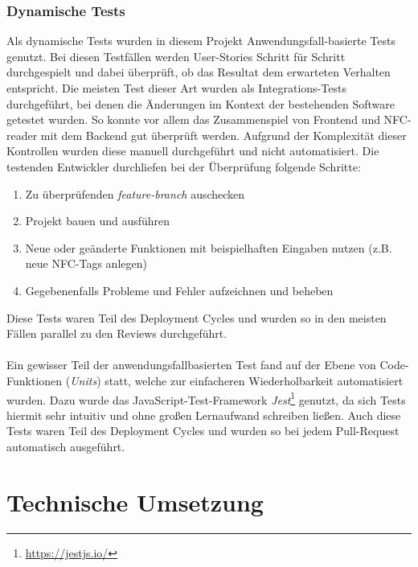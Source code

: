 \documentclass[10pt, a4paper]{article}
\begin{document}
\begin{onehalfspace}
  \subsubsection*{Dynamische Tests}
    Als dynamische Tests wurden in diesem Projekt Anwendungsfall-basierte Tests genutzt.
    Bei diesen Testfällen werden User-Stories Schritt für Schritt \glqq durchgespielt\grqq{} und dabei überprüft, ob das Resultat  dem erwarteten Verhalten entspricht.
    Die meisten Test dieser Art wurden als Integrations-Tests durchgeführt, bei denen die Änderungen im Kontext der bestehenden Software getestet wurden.
    So konnte vor allem das Zusammenspiel von Frontend und NFC-reader mit dem Backend gut überprüft werden.
    Aufgrund der Komplexität dieser Kontrollen wurden diese manuell durchgeführt und nicht automatisiert.
    Die testenden Entwickler durchliefen bei der Überprüfung folgende Schritte:
    \begin{enumerate}
      \item Zu überprüfenden \textit{feature-branch} auschecken
      \item Projekt bauen und ausführen
      \item Neue oder geänderte Funktionen mit beispielhaften Eingaben nutzen (z.B. neue NFC-Tags anlegen)
      \item Gegebenenfalls Probleme und Fehler aufzeichnen und beheben
    \end{enumerate}
    Diese Tests waren Teil des Deployment Cycles und wurden so in den meisten Fällen parallel zu den Reviews durchgeführt.
    \\~\\
    Ein gewisser Teil der anwendungsfallbasierten Test fand auf der Ebene von Code-Funktionen (\textit{Units}) statt, welche zur einfacheren Wiederholbarkeit automatisiert wurden.
    Dazu wurde das JavaScript-Test-Framework \textit{Jest}\footnote{\raggedright\url{https://jestjs.io/}} genutzt, da sich Tests hiermit sehr intuitiv und ohne großen Lernaufwand schreiben ließen.
    Auch diese Tests waren Teil des Deployment Cycles und wurden so bei jedem Pull-Request automatisch ausgeführt.

\section{Technische Umsetzung}

\end{onehalfspace}
\end{document}

